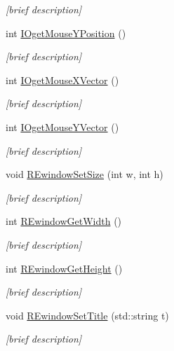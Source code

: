 \begin{DoxyCompactItemize}
\begin{DoxyCompactList}\small\item\em \mbox{[}brief description\mbox{]} \end{DoxyCompactList}\item 
int \hyperlink{class_i_s_e_a0f9c9a2f79bb7d8773debf78d2cdbbc1}{I\-Oget\-Mouse\-Y\-Position} ()
\begin{DoxyCompactList}\small\item\em \mbox{[}brief description\mbox{]} \end{DoxyCompactList}\item 
int \hyperlink{class_i_s_e_a1b076037e55f2426dab4ce3145ca17f6}{I\-Oget\-Mouse\-X\-Vector} ()
\begin{DoxyCompactList}\small\item\em \mbox{[}brief description\mbox{]} \end{DoxyCompactList}\item 
int \hyperlink{class_i_s_e_a1a81ea6d316cff89168c518005c09037}{I\-Oget\-Mouse\-Y\-Vector} ()
\begin{DoxyCompactList}\small\item\em \mbox{[}brief description\mbox{]} \end{DoxyCompactList}\item 
void \hyperlink{class_i_s_e_a6a5e83f6e8e6204a9bc0812c3b0b2940}{R\-Ewindow\-Set\-Size} (int w, int h)
\begin{DoxyCompactList}\small\item\em \mbox{[}brief description\mbox{]} \end{DoxyCompactList}\item 
int \hyperlink{class_i_s_e_adf082603197ef3c9252c03c16ec31cae}{R\-Ewindow\-Get\-Width} ()
\begin{DoxyCompactList}\small\item\em \mbox{[}brief description\mbox{]} \end{DoxyCompactList}\item 
int \hyperlink{class_i_s_e_adb3302c6bfad978aa8dbe5c03ccf3280}{R\-Ewindow\-Get\-Height} ()
\begin{DoxyCompactList}\small\item\em \mbox{[}brief description\mbox{]} \end{DoxyCompactList}\item 
void \hyperlink{class_i_s_e_a9de85a7b59329612bd8533c1976be1e6}{R\-Ewindow\-Set\-Title} (std\-::string t)
\begin{DoxyCompactList}\small\item\em \mbox{[}brief description\mbox{]} \end{DoxyCompactList}\item 

\end{DoxyCompactItemize}
